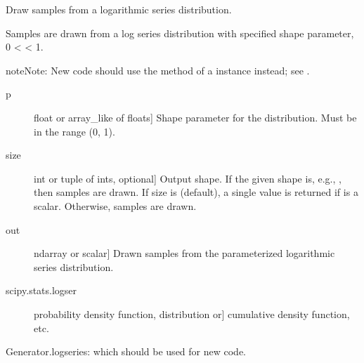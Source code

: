\documentclass[letterpaper,10pt,english]{sphinxmanual}
\begin{document}

\begin{fulllineitems}
\label{\detokenize{infrapy.utils:infrapy.utils.ref2sac.logseries}}
Draw samples from a logarithmic series distribution.

Samples are drawn from a log series distribution with specified
shape parameter, 0 \textless{}  \textless{} 1.

\begin{sphinxadmonition}{note}{Note:}
New code should use the  method of a 
instance instead; see .
\end{sphinxadmonition}
\begin{description}
\item[{p}] \leavevmode{[}float or array\_like of floats{]}
Shape parameter for the distribution.  Must be in the range (0, 1).

\item[{size}] \leavevmode{[}int or tuple of ints, optional{]}
Output shape.  If the given shape is, e.g., , then
 samples are drawn.  If size is  (default),
a single value is returned if  is a scalar.  Otherwise,
 samples are drawn.

\end{description}
\begin{description}
\item[{out}] \leavevmode{[}ndarray or scalar{]}
Drawn samples from the parameterized logarithmic series distribution.

\end{description}
\begin{description}
\item[{scipy.stats.logser}] \leavevmode{[}probability density function, distribution or{]}
cumulative density function, etc.

\end{description}

Generator.logseries: which should be used for new code.


\end{fulllineitems}
\end{document}
